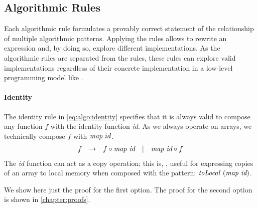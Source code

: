 
\newenvironment{rerule}[1]%
{\begin{equation}\begin{array}{#1}\ignorespaces}%
{\end{array}\end{equation}%
\ignorespacesafterend}

\newenvironment{rerule*}[1]%
{\begin{equation*}\begin{array}{#1}\ignorespaces}%
{\end{array}\end{equation*}%
\ignorespacesafterend}


\newcommand{\comment}[1] {%
\{\text{\small #1}\}%
}

\subsection{Algorithmic Rules}
\label{section:rules:algo}

Each algorithmic rule formulates a provably correct statement of the relationship of multiple algorithmic patterns.
Applying the rules allows to rewrite an expression and, by doing so, explore different implementations.
As the algorithmic rules are separated from the  \OpenCL rules, these rules can explore valid implementations regardless of their concrete implementation in a low-level programming model like \OpenCL.

\paragraph{Identity}
The identity rule in \autoref{eq:algo:identity} specifies that it is always valid to compose any function $f$ with the identity function \emph{id}.
As we always operate on arrays, we technically compose $f$ with $\text{\textit{map}}\ id$.
%
\begin{rerule}{lclcl}
  f & \rightarrow & f \circ \map\ \textit{id} & | & \map\ \textit{id} \circ f
  \label{eq:algo:identity}
\end{rerule}
%
The \textit{id} function can act as a copy operation; this is, \eg, useful for expressing copies of an array to local memory when composed with the \toLocal \OpenCL pattern: $\text{\textit{toLocal}}\ (\text{\textit{map}}\ \textit{id})$.

We show here just the proof for the first option.
The proof for the second option is shown in \autoref{chapter:proofs}.

